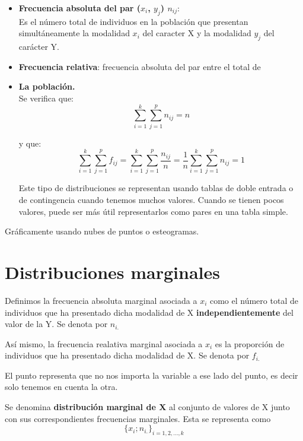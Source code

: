 \documentclass{article}
\theoremstyle{definition}
\begin{document}
\begin{itemize}

 \item \textbf{Frecuencia absoluta del par ($x_i$, $y_j$) $n_{ij}$}: \\

 Es el número total de individuos en la población que presentan simultáneamente
 la modalidad $x_i$ del caracter X y la modalidad $y_j$ del carácter Y.  \\

 \item \textbf{Frecuencia relativa}: frecuencia absoluta del par entre el total de
 \item \textbf{La población.} \\

 Se verifica que:    $$ \sum_{i=1}^{k} \sum_{j=1}^{p} n_{ij} = n$$

 y que: $$\sum_{i=1}^{k} \sum_{j=1}^{p} f_{ij} = \sum_{i=1}^{k} \sum_{j=1}^{p}
 \frac{n_{ij}}{n} = \frac{1}{n} \sum_{i=1}^{k} \sum_{j=1}^{p} n_{ij} = 1$$

Este tipo de distribuciones se representan usando tablas de doble entrada o de
contingencia cuando tenemos muchos valores. Cuando se tienen pocos valores,
puede ser más útil representarlos como pares en una tabla simple.

\end{itemize}

\vspace{5cm}

Gráficamente usando nubes de puntos o esteogramas.

\section{Distribuciones marginales}

Definimos la frecuencia absoluta marginal asociada a $x_i$ como el número
total de individuos que ha presentado dicha modalidad de X
\textbf{independientemente} del valor de la Y. Se denota por $n_{i.}$

Así mismo, la frecuencia realativa marginal asociada a $x_i$ es la proporción
de individuos que ha presentado dicha modalidad de X. Se denota por $f_{i.}$

El punto representa que no nos importa la variable a ese lado del punto, es
decir solo tenemos en cuenta la otra.

Se denomina \textbf{ distribución marginal de X} al conjunto de valores de X
junto con sus correspondientes frecuencias marginales. Esta se representa como
$${\{x_i;n_{i.}\}}_{i = 1,2,\dots,k}$$
\end{document}
